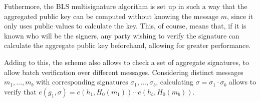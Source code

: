 Futhermore, the BLS multisignature algorithm is set up in such a way that the aggregated public key can be computed without knowing the message $m$, since it only uses public values to calculate the key. This, of course, means that, if it is known who will be the signers, any party wishing to verify the signature can calculate the aggregate public key beforehand, allowing for greater performance.

Adding to this, the scheme also allows to check a set of aggregate signatures, to allow batch verification over different messages. Considering distinct messages $m_1,\dots,m_b$ with corresponding signatures $\sigma_1,\dots,\sigma_b$, calculating $\sigma=\sigma_1\cdot\sigma_b$ allows to verify that $e(g_1,\sigma)=e(h_1,H_0(m_1))\cdots e(h_b,H_0(m_b))$.